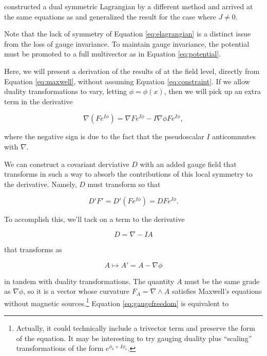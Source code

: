 \documentclass{article}
\begin{document}
  \cite{tiwari} constructed a dual symmetric Lagrangian by a different method and arrived at the same equations as \cite{malik} and generalized the result for the case where $J \not= 0$.

  Note that the lack of symmetry of Equation \ref{eq:elagrangian} is a distinct issue from the loss of gauge invariance. To maintain gauge invariance, the potential must be promoted to a full multivector as in Equation \ref{eq:potential}.

  Here, we will present a derivation of the results of \cite{tiwari} at the field level, directly from Equation \ref{eq:maxwell}, without assuming Equation \ref{eq:constraint}. If we allow duality transformations to vary, letting $\phi = \phi(x)$, then we will pick up an extra term in the derivative

  \begin{equation}
    \nabla (F e^{I \phi}) = \nabla F e^{I \phi} - I \nabla \phi F e^{I\phi},
  \end{equation}

  where the negative sign is due to the fact that the pseudoscalar $I$ anticommutes with $\nabla$.

  We can construct a covariant derviative $D$ with an added gauge field that transforms in such a way to absorb the contributions of this local symmetry to the derivative. Namely, $D$ must transform so that

  \begin{equation}
    D' F' = D' (F e^{I \phi}) = D F e^{I \phi}. \label{eq:covariant}
  \end{equation}

  To accomplish this, we'll tack on a term to the derivative

  \begin{equation}
    D = \nabla - I A
  \end{equation}

  that transforms as

  \begin{equation}
    A \mapsto A' = A - \nabla \phi\label{eq:gaugefreedom}
  \end{equation}

  in tandem with duality transformations. The quantity $A$ must be the same grade as $\nabla \phi$, so it is a vector whose curvature $F_A = \nabla \wedge A$ satisfies Maxwell's equations without magnetic sources.\footnote{Actually, it could technically include a trivector term and preserve the form of the equation. It may be interesting to try gauging duality plus ``scaling'' transformations of the form $e^{\phi_b + I \phi_e}$.} Equation \ref{eq:gaugefreedom} is equivalent to
\end{document}
